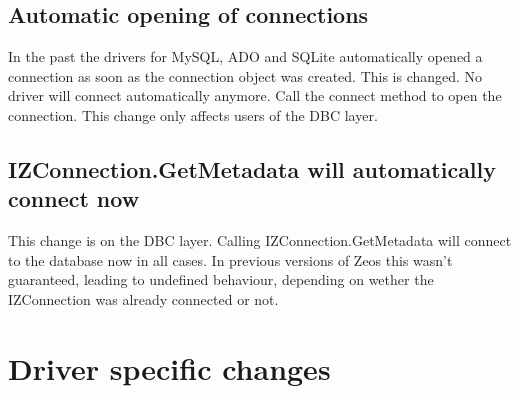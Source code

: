 \documentclass[a4paper,12pt,oneside]{article}
\begin{document}
\subsection{Automatic opening of connections}
\label{BreakingChanges_AutomaticOpeningOfConnections}
In the past the drivers for MySQL, ADO and SQLite automatically opened a connection as soon as the connection object was created.
This is changed.
No driver will connect automatically anymore.
Call the connect method to open the connection.
This change only affects users of the DBC layer.

\subsection{IZConnection.GetMetadata will automatically connect now}
\label{BreakingChanges_IZConnectionGetMetadataAutoconnect}
This change is on the DBC layer.
Calling IZConnection.GetMetadata will connect to the database now in all cases.
In previous versions of Zeos this wasn't guaranteed, leading to undefined behaviour, depending on wether the IZConnection was already connected or not.

\section{Driver specific changes}
\label{sec:DriverSpecificChanges}
\end{document}
